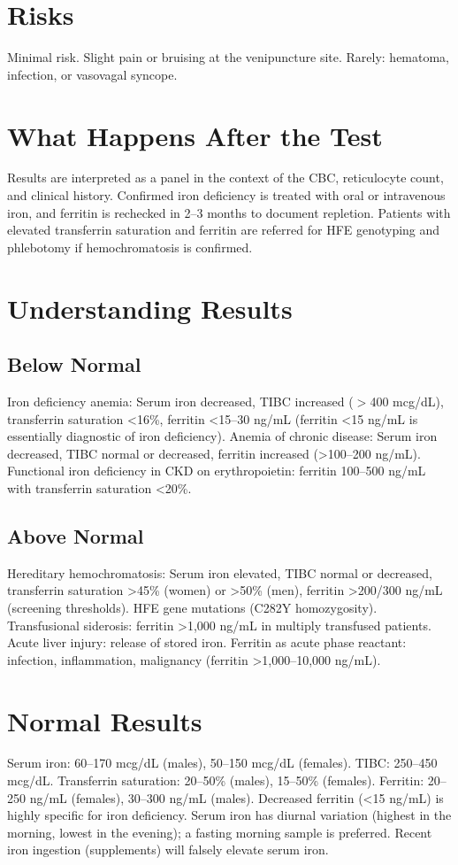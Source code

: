 \section*{Risks}
Minimal risk. Slight pain or bruising at the venipuncture site. Rarely: hematoma, infection, or vasovagal syncope.
\section*{What Happens After the Test}
Results are interpreted as a panel in the context of the CBC, reticulocyte count, and clinical history. Confirmed iron deficiency is treated with oral or intravenous iron, and ferritin is rechecked in 2--3 months to document repletion. Patients with elevated transferrin saturation and ferritin are referred for HFE genotyping and phlebotomy if hemochromatosis is confirmed.
\section*{Understanding Results}
\subsection*{Below Normal}
Iron deficiency anemia: Serum iron decreased, TIBC increased ($>$400 mcg/dL), transferrin saturation <16\%, ferritin <15--30 ng/mL (ferritin <15 ng/mL is essentially diagnostic of iron deficiency). Anemia of chronic disease: Serum iron decreased, TIBC normal or decreased, ferritin increased (>100--200 ng/mL). Functional iron deficiency in CKD on erythropoietin: ferritin 100--500 ng/mL with transferrin saturation <20\%.
\subsection*{Above Normal}
Hereditary hemochromatosis: Serum iron elevated, TIBC normal or decreased, transferrin saturation >45\% (women) or >50\% (men), ferritin >200/300 ng/mL (screening thresholds). HFE gene mutations (C282Y homozygosity). Transfusional siderosis: ferritin >1,000 ng/mL in multiply transfused patients. Acute liver injury: release of stored iron. Ferritin as acute phase reactant: infection, inflammation, malignancy (ferritin >1,000--10,000 ng/mL).
\section*{Normal Results}
Serum iron: 60--170 mcg/dL (males), 50--150 mcg/dL (females). TIBC: 250--450 mcg/dL. Transferrin saturation: 20--50\% (males), 15--50\% (females). Ferritin: 20--250 ng/mL (females), 30--300 ng/mL (males). Decreased ferritin (<15 ng/mL) is highly specific for iron deficiency. Serum iron has diurnal variation (highest in the morning, lowest in the evening); a fasting morning sample is preferred. Recent iron ingestion (supplements) will falsely elevate serum iron.
